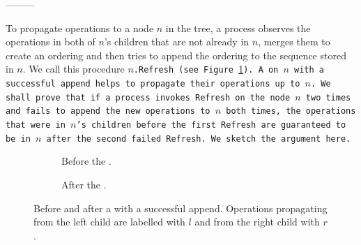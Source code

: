 

---------



To propagate operations to a node $n$ in the tree, a process observes
the operations in both of $n$'s children that are not already in $n$,
merges them to create an ordering and then tries to append the
ordering to the sequence stored in $n$. We call this procedure
\tt{$n$.Refresh} (see Figure \ref{fig::propagstep}). A  on
$n$ with a successful append helps to propagate their operations up to
$n$. We shall prove that if a process invokes \tt{Refresh} on the node
$n$ two times and fails to append the new operations to $n$ both
times, the operations that were in $n$'s children before the first
\tt{Refresh} are guaranteed to be in $n$ after the second failed
\tt{Refresh}. 
We sketch the argument here.

\begin{figure}[hbtp]
\begin{center}
\hspace{6em}\begin{subfigure}[b]{.29\textwidth}
  \centering
  \resizebox{\columnwidth}{!}{
  \begin{tikzpicture}[level 1/.style={level distance=1.2cm,sibling distance=0.5cm}]
\Tree [.$r_1,l_1,l_2,r_2,l_3$
$l_1,l_2,l_3,l_4,l_5$
$r_1,r_2,r_3,r_4$ ]
\end{tikzpicture}}
  \caption{Before the .}
\end{subfigure}
\hfill
\begin{subfigure}[b]{.29\textwidth}
  \centering
  \resizebox{\columnwidth}{!}{
  \begin{tikzpicture}[level 1/.style={level distance=1.2cm,sibling distance=0.5cm}]
\Tree [.$r_1,l_1,l_2,r_2,l_3,l_4,l_5,r_3,r_4$
$l_1,l_2,l_3,l_4,l_5$
$r_1,r_2,r_3,r_4$ ]
\end{tikzpicture}}
  \caption{After the .}
\end{subfigure}
\hspace{6em}
\caption[A successful .]{\label{fig::propagstep} Before
  and after a  with a successful append. Operations
  propagating from the left child are labelled with $l$ and from the
  right child with $r$.} 
\end{center}
\end{figure}

